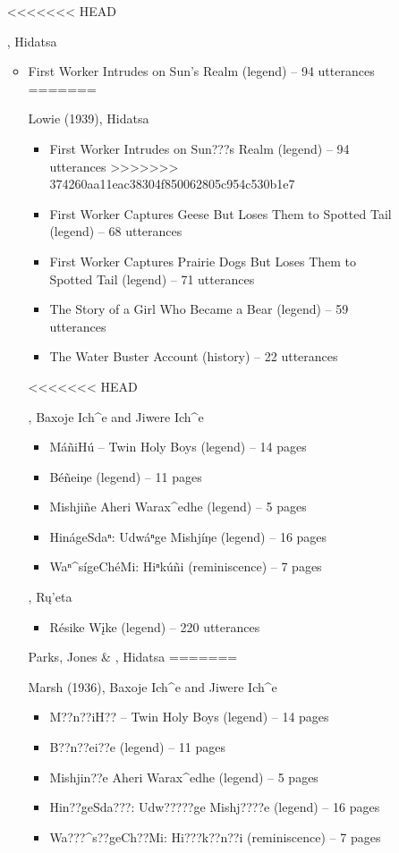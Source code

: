 \documentclass[output=paper]{LSP/langsci}
\begin{document}
\begin{description}
\begin{itemize}
<<<<<<< HEAD
\item[\citet{Lowie1939}, Hidatsa]\hfill
\begin{itemize}
\item First Worker Intrudes on Sun’s Realm (legend) -- 94 utterances
=======
\item[Lowie (1939), Hidatsa]\hfill
\begin{itemize}
\item First Worker Intrudes on Sun???s Realm (legend) -- 94 utterances
>>>>>>> 374260aa11eac38304f850062805c954c530b1e7
\item First Worker Captures Geese But Loses Them to Spotted Tail (legend) -- 68 utterances
\item First Worker Captures Prairie Dogs But Loses Them to Spotted Tail (legend) -- 71 utterances
\item The Story of a Girl Who Became a Bear (legend) -- 59 utterances
\item The Water Buster Account (history) -- 22 utterances
\end{itemize}

<<<<<<< HEAD
\item[\citet{Marsh1936}, Baxoje Ich\^{}e and Jiwere Ich\^{}e]\hfill
\begin{itemize}
\item MáñiHú -- Twin Holy Boys (legend) -- 14 pages
\item Béñeiŋe (legend) -- 11 pages
\item Mishjiñe Aheri Warax\^{}edhe (legend) -- 5 pages
\item HinágeSdaⁿ: Udwáⁿge Mishjíŋe (legend) -- 16 pages
\item Waⁿ\^{}sígeChéMi: Hiⁿkúñi (reminiscence) -- 7 pages
\end{itemize}

\item[\citet{Mixco1997}, Rų’eta]\hfill
\begin{itemize}
\item Résike Wįke (legend) -- 220 utterances
\end{itemize}

\item[Parks, Jones \& \citet{Hollow1978}, Hidatsa]\hfill
=======
\item[Marsh (1936), Baxoje Ich\^{}e and Jiwere Ich\^{}e]\hfill
\begin{itemize}
\item M??n??iH?? -- Twin Holy Boys (legend) -- 14 pages
\item B??n??ei??e (legend) -- 11 pages
\item Mishjin??e Aheri Warax\^{}edhe (legend) -- 5 pages
\item Hin??geSda???: Udw?????ge Mishj????e (legend) -- 16 pages
\item Wa???\^{}s??geCh??Mi: Hi???k??n??i (reminiscence) -- 7 pages
\end{itemize}


\end{itemize}
\end{itemize}
\end{description}
\end{document}
